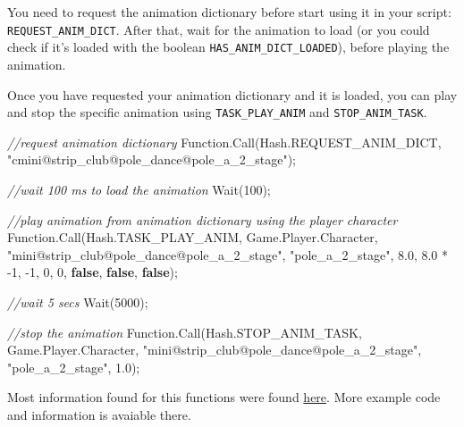 \documentclass[
  openany]{book}
\newenvironment{Shaded}{\begin{snugshade}}{\end{snugshade}}
\newcommand{\CommentTok}[1]{\textcolor[rgb]{0.56,0.35,0.01}{\textit{#1}}}
\newcommand{\DecValTok}[1]{\textcolor[rgb]{0.00,0.00,0.81}{#1}}
\newcommand{\FloatTok}[1]{\textcolor[rgb]{0.00,0.00,0.81}{#1}}
\newcommand{\FunctionTok}[1]{\textcolor[rgb]{0.00,0.00,0.00}{#1}}
\newcommand{\KeywordTok}[1]{\textcolor[rgb]{0.13,0.29,0.53}{\textbf{#1}}}
\newcommand{\NormalTok}[1]{#1}
\newcommand{\StringTok}[1]{\textcolor[rgb]{0.31,0.60,0.02}{#1}}
\begin{document}
You need to request the animation dictionary before start using it in your script: \texttt{REQUEST\_ANIM\_DICT}.
After that, wait for the animation to load (or you could check if it's loaded with the boolean \texttt{HAS\_ANIM\_DICT\_LOADED}), before playing the animation.

Once you have requested your animation dictionary and it is loaded, you can play and stop the specific animation using \texttt{TASK\_PLAY\_ANIM} and \texttt{STOP\_ANIM\_TASK}.

\begin{Shaded}
\begin{Highlighting}[]
\CommentTok{//request animation dictionary}
\NormalTok{Function.}\FunctionTok{Call}\NormalTok{(Hash.}\FunctionTok{REQUEST_ANIM_DICT}\NormalTok{, }\StringTok{"cmini@strip_club@pole_dance@pole_a_2_stage"}\NormalTok{);}
 
\CommentTok{//wait 100 ms to load the animation}
\FunctionTok{Wait}\NormalTok{(}\DecValTok{100}\NormalTok{);}
 
\CommentTok{//play animation from animation dictionary using the player character}
\NormalTok{Function.}\FunctionTok{Call}\NormalTok{(Hash.}\FunctionTok{TASK_PLAY_ANIM}\NormalTok{, Game.}\FunctionTok{Player}\NormalTok{.}\FunctionTok{Character}\NormalTok{, }\StringTok{"mini@strip_club@pole_dance@pole_a_2_stage"}\NormalTok{, }\StringTok{"pole_a_2_stage"}\NormalTok{, }\FloatTok{8.0}\NormalTok{, }\FloatTok{8.0}\NormalTok{ * }\DecValTok{-1}\NormalTok{, }\DecValTok{-1}\NormalTok{, }\DecValTok{0}\NormalTok{, }\DecValTok{0}\NormalTok{, }\KeywordTok{false}\NormalTok{, }\KeywordTok{false}\NormalTok{, }\KeywordTok{false}\NormalTok{);}
 
\CommentTok{//wait 5 secs}
\FunctionTok{Wait}\NormalTok{(}\DecValTok{5000}\NormalTok{);}
 
\CommentTok{//stop the animation}
\NormalTok{Function.}\FunctionTok{Call}\NormalTok{(Hash.}\FunctionTok{STOP_ANIM_TASK}\NormalTok{, Game.}\FunctionTok{Player}\NormalTok{.}\FunctionTok{Character}\NormalTok{, }\StringTok{"mini@strip_club@pole_dance@pole_a_2_stage"}\NormalTok{, }\StringTok{"pole_a_2_stage"}\NormalTok{, }\FloatTok{1.0}\NormalTok{);}
\end{Highlighting}
\end{Shaded}

Most information found for this functions were found \href{Source:\%20http://gtaxscripting.blogspot.com/2016/06/tut-gta-v-playing-and-handling.html}{here}. More example code and information is avaiable there.
\end{document}

